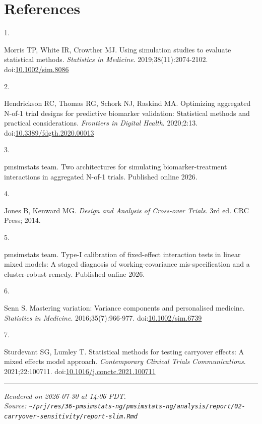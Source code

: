 \documentclass[
  11pt,
]{article}
\newlength{\cslhangindent}
\newlength{\csllabelwidth}
\newenvironment{CSLReferences}[2] %
 {\begin{list}{}{%
  \setlength{\itemindent}{0pt}
  \setlength{\leftmargin}{0pt}
  \setlength{\parsep}{0pt}
  \ifodd #1
   \setlength{\leftmargin}{\cslhangindent}
   \setlength{\itemindent}{-1\cslhangindent}
  \fi
  \setlength{\itemsep}{#2\baselineskip}}}
 {\end{list}}
\newcommand{\CSLLeftMargin}[1]{\parbox[t]{\csllabelwidth}{\strut#1\strut}}
\newcommand{\CSLRightInline}[1]{\parbox[t]{\linewidth - \csllabelwidth}{\strut#1\strut}}
\begin{document}
\section{References}\label{references}

\protect{}\label{refs}
\begin{CSLReferences}{0}{1}
\CSLLeftMargin{1. }%
\CSLRightInline{Morris TP, White IR, Crowther MJ. Using simulation studies to evaluate statistical methods. \emph{Statistics in Medicine}. 2019;38(11):2074-2102. doi:\href{https://doi.org/10.1002/sim.8086}{10.1002/sim.8086}}

\CSLLeftMargin{2. }%
\CSLRightInline{Hendrickson RC, Thomas RG, Schork NJ, Raskind MA. Optimizing aggregated {N}-of-1 trial designs for predictive biomarker validation: Statistical methods and practical considerations. \emph{Frontiers in Digital Health}. 2020;2:13. doi:\href{https://doi.org/10.3389/fdgth.2020.00013}{10.3389/fdgth.2020.00013}}

\CSLLeftMargin{3. }%
\CSLRightInline{{pmsimstats team}. Two architectures for simulating biomarker-treatment interactions in aggregated {N}-of-1 trials. Published online 2026.}

\CSLLeftMargin{4. }%
\CSLRightInline{Jones B, Kenward MG. \emph{Design and Analysis of Cross-over Trials}. 3rd ed. CRC Press; 2014.}

\CSLLeftMargin{5. }%
\CSLRightInline{{pmsimstats team}. Type-{I} calibration of fixed-effect interaction tests in linear mixed models: A staged diagnosis of working-covariance mis-specification and a cluster-robust remedy. Published online 2026.}

\CSLLeftMargin{6. }%
\CSLRightInline{Senn S. Mastering variation: Variance components and personalised medicine. \emph{Statistics in Medicine}. 2016;35(7):966-977. doi:\href{https://doi.org/10.1002/sim.6739}{10.1002/sim.6739}}

\CSLLeftMargin{7. }%
\CSLRightInline{Sturdevant SG, Lumley T. Statistical methods for testing carryover effects: A mixed effects model approach. \emph{Contemporary Clinical Trials Communications}. 2021;22:100711. doi:\href{https://doi.org/10.1016/j.conctc.2021.100711}{10.1016/j.conctc.2021.100711}}

\end{CSLReferences}

\vfill

\begin{center}\rule{0.5\linewidth}{0.5pt}\end{center}

\emph{Rendered on 2026-07-30 at 14:06 PDT.}\\
\emph{Source: \texttt{\textasciitilde{}/prj/res/36-pmsimstats-ng/pmsimstats-ng/analysis/report/02-carryover-sensitivity/report-slim.Rmd}}
\end{document}
